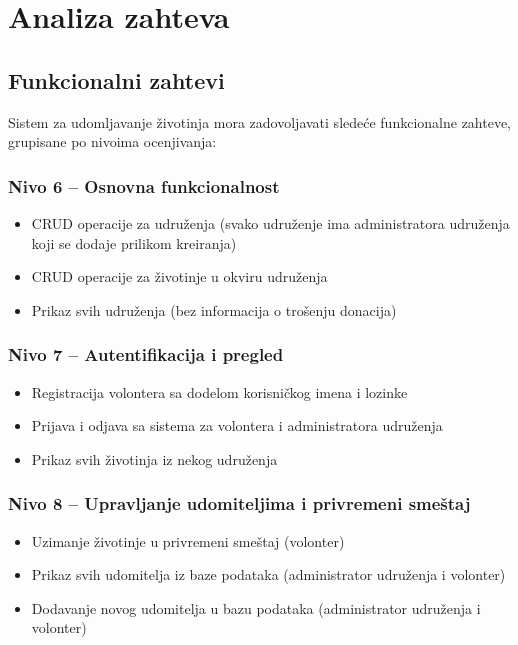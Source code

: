 \chapter{Analiza zahteva}

\section{Funkcionalni zahtevi}

Sistem za udomljavanje životinja mora zadovoljavati sledeće funkcionalne zahteve, grupisane po nivoima ocenjivanja:

\subsection{Nivo 6 – Osnovna funkcionalnost}

\begin{itemize}
    \item CRUD operacije za udruženja (svako udruženje ima administratora udruženja koji se dodaje prilikom kreiranja)
    \item CRUD operacije za životinje u okviru udruženja
    \item Prikaz svih udruženja (bez informacija o trošenju donacija)
\end{itemize}

\subsection{Nivo 7 – Autentifikacija i pregled}

\begin{itemize}
    \item Registracija volontera sa dodelom korisničkog imena i lozinke
    \item Prijava i odjava sa sistema za volontera i administratora udruženja
    \item Prikaz svih životinja iz nekog udruženja
\end{itemize}

\subsection{Nivo 8 – Upravljanje udomiteljima i privremeni smeštaj}

\begin{itemize}
    \item Uzimanje životinje u privremeni smeštaj (volonter)
    \item Prikaz svih udomitelja iz baze podataka (administrator udruženja i volonter)
    \item Dodavanje novog udomitelja u bazu podataka (administrator udruženja i volonter)
\end{itemize}

